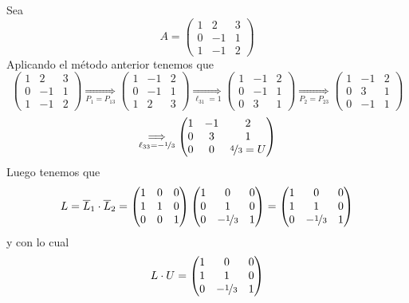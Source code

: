 \begin{ejem}
 Sea 
 $$A=\begin{pmatrix}
     1&2&3\\0&-1&1\\ 1&-1&2
 \end{pmatrix}$$
 Aplicando el método anterior tenemos que
 $$\begin{pmatrix}
     1&2&3\\0&-1&1\\ 1&-1&2
 \end{pmatrix}\underset{P_1=P_{13}}{\Longrightarrow}\begin{pmatrix}
     1&-1&2\\0&-1&1\\ 1&2&3
 \end{pmatrix}\underset{\ell_{31}=1}{\Longrightarrow}
 \begin{pmatrix}
     1&-1&2\\0&-1&1\\ 0&3&1
 \end{pmatrix}\underset{P_2=P_{23}}{\Longrightarrow}\begin{pmatrix}
     1&-1&2\\0&3&1\\ 0&-1&1
 \end{pmatrix} $$
 $$\underset{\ell_{33}=-\nicefrac{1}{3}}{\Longrightarrow} \begin{pmatrix}
     1 & -1 & 2 \\ 0 & 3 & 1 \\ 0 & 0 & \nicefrac{4}{3} = U
 \end{pmatrix}$$
 Luego tenemos que
 $$L=\overline{L}_1 \cdot \overline{L}_2=\begin{pmatrix}
     1 & 0 & 0 \\ 1 & 1 & 0 \\ 0 & 0 & 1 
 \end{pmatrix} \begin{pmatrix}
     1 & 0 & 0 \\  0 & 1 & 0 \\ 0 & - \nicefrac{1}{3} & 1
 \end{pmatrix}= \begin{pmatrix}
     1 & 0 & 0 \\  1 & 1 & 0 \\ 0 & - \nicefrac{1}{3} & 1
 \end{pmatrix}$$
 y con lo cual
 $$L\cdot U=\begin{pmatrix}
      1 & 0 & 0 \\  1 & 1 & 0 \\ 0 & - \nicefrac{1}{3} & 1    

\end{pmatrix}$$
\end{ejem}
